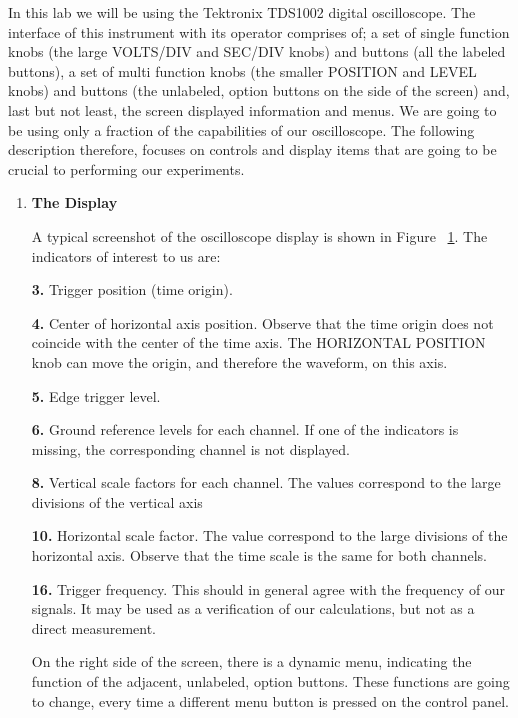 In this lab we will be using the Tektronix TDS1002 digital oscilloscope.
The interface of this instrument with its operator comprises of; a set of
single function knobs (the large VOLTS/DIV and SEC/DIV knobs) and buttons
(all the labeled buttons), a set of multi function knobs (the smaller
POSITION and LEVEL knobs) and buttons (the unlabeled, option buttons on the
side of the screen) and, last but not least, the screen displayed information
and menus. We are going to be using only a fraction of the capabilities of
our oscilloscope. The following description therefore, focuses on controls
and display items that are going to be crucial to performing our experiments. 

\begin{enumerate}

\begin{figure}[htb]
\centerline{\epsfxsize=16cm }
\caption{The Tektronix model TDS1002 oscilloscope display.}
\label{fig:scope:dscope}
\end{figure}

\item {\bf The Display}

A typical screenshot of the oscilloscope display is shown in
Figure ~\ref{fig:scope:dscope}. The indicators of interest to us are:

{\bf 3.} Trigger position (time origin).

{\bf 4.} Center of horizontal axis position. Observe that the time origin
does not coincide with the center of the time axis. The HORIZONTAL POSITION
knob can move the origin, and therefore the waveform, on this axis.

{\bf 5.} Edge trigger level.

{\bf 6.} Ground reference levels for each channel. If one of the indicators
is missing, the corresponding channel is not displayed.

{\bf 8.} Vertical scale factors for each channel. The values correspond to
the large divisions of the vertical axis

{\bf 10.} Horizontal scale factor. The value correspond to the large
divisions of the horizontal axis. Observe that the time scale is the same for
both channels.

{\bf 16.} Trigger frequency. This should in general agree with the frequency
of our signals. It may be used as a verification of our calculations, but not
as a direct measurement.

On the right side of the screen, there is a dynamic menu, indicating the
function of the adjacent, unlabeled, option buttons. These functions are
going to change, every time a different menu button is pressed on the control
panel.


\end{enumerate}
